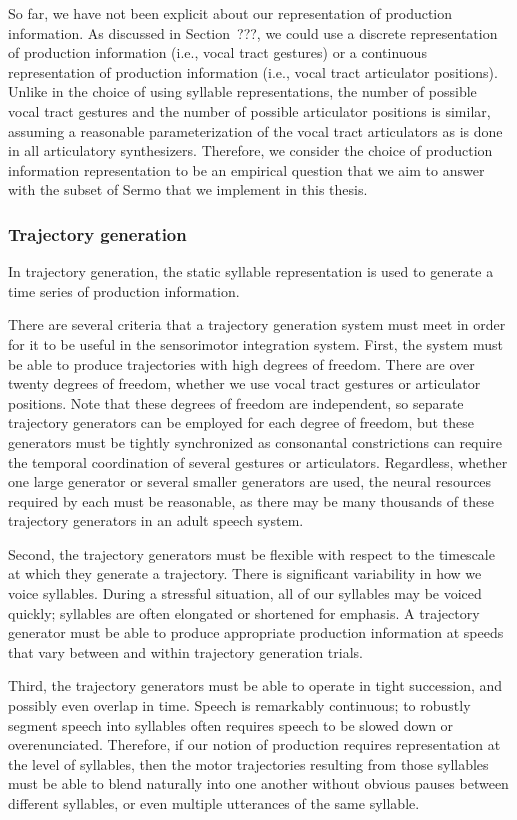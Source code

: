 So far, we have not been explicit
about our representation of production information.
As discussed in Section~???,
we could use a discrete representation
of production information
(i.e., vocal tract gestures)
or a continuous representation
of production information
(i.e., vocal tract articulator positions).
Unlike in the choice of
using syllable representations,
the number of possible vocal tract gestures
and the number of possible articulator positions
is similar,
assuming a reasonable parameterization
of the vocal tract articulators
as is done in all articulatory synthesizers.
Therefore, we consider the choice
of production information representation
to be an empirical question
that we aim to answer
with the subset of Sermo that we implement
in this thesis.

\subsubsection{Trajectory generation}

In trajectory generation,
the static syllable representation
is used to generate
a time series of production information.

There are several criteria
that a trajectory generation system
must meet in order for it to be
useful in the sensorimotor integration system.
First, the system must be able to produce
trajectories with high degrees of freedom.
There are over twenty degrees of freedom,
whether we use vocal tract gestures
or articulator positions.
Note that these degrees of freedom
are independent,
so separate trajectory generators
can be employed for each degree of freedom,
but these generators must be
tightly synchronized as
consonantal constrictions can require
the temporal coordination
of several gestures or articulators.
Regardless, whether one large generator
or several smaller generators are used,
the neural resources required by each
must be reasonable,
as there may be many thousands
of these trajectory generators
in an adult speech system.

Second, the trajectory generators
must be flexible with respect to
the timescale at which
they generate a trajectory.
There is significant variability
in how we voice syllables.
During a stressful situation,
all of our syllables may be
voiced quickly;
syllables are often elongated
or shortened for emphasis.
A trajectory generator must be
able to produce appropriate
production information
at speeds that vary
between and within
trajectory generation trials.

Third, the trajectory generators
must be able to operate
in tight succession,
and possibly even overlap in time.
Speech is remarkably continuous;
to robustly segment speech into
syllables often requires
speech to be slowed down
or overenunciated.
Therefore, if our notion of production
requires representation at the level of syllables,
then the motor trajectories
resulting from those syllables
must be able to blend naturally into one another
without obvious pauses between
different syllables,
or even multiple utterances of the same syllable.

